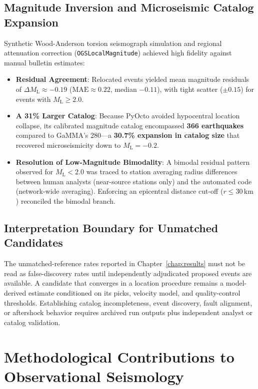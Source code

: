 \subsection{Magnitude Inversion and Microseismic Catalog Expansion}
Synthetic Wood-Anderson torsion seismograph simulation and regional attenuation correction (\texttt{OGSLocalMagnitude}) achieved high fidelity against manual bulletin estimates:
\begin{itemize}
  \item \textbf{Residual Agreement}: Relocated events yielded mean magnitude residuals of $\Delta M_{\mathrm{L}} \approx -0.19$ ($\mathrm{MAE} \approx 0.22$, median $-0.11$), with tight scatter ($\pm 0.15$) for events with $M_{\mathrm{L}} \ge 2.0$.
  \item \textbf{A 31\% Larger Catalog}: Because PyOcto avoided hypocentral location collapse, its calibrated magnitude catalog encompassed \textbf{366 earthquakes} compared to GaMMA's 280---a \textbf{30.7\% expansion in catalog size} that recovered microseismicity down to $M_{\mathrm{L}} = -0.2$.
  \item \textbf{Resolution of Low-Magnitude Bimodality}: A bimodal residual pattern observed for $M_{\mathrm{L}} < 2.0$ was traced to station averaging radius differences between human analysts (near-source stations only) and the automated code (network-wide averaging). Enforcing an epicentral distance cut-off ($r \le 30\,\unit{\kilo\meter}$) reconciled the bimodal branch.
\end{itemize}

\subsection{Interpretation Boundary for Unmatched Candidates}
The unmatched-reference rates reported in Chapter~\ref{chap:results} must not be read as false-discovery rates until independently adjudicated proposed events are available. A candidate that converges in a location procedure remains a model-derived estimate conditioned on its picks, velocity model, and quality-control thresholds. Establishing catalog incompleteness, event discovery, fault alignment, or aftershock behavior requires archived run outputs plus independent analyst or catalog validation.

\section{Methodological Contributions to Observational Seismology}
\label{sec:conclusion_methodology}

